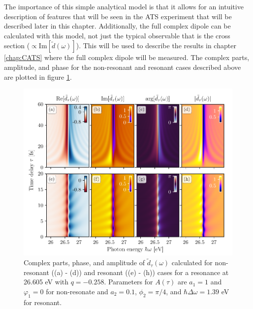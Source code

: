 The importance of this simple analytical model is that it allows for an intuitive description of features that will be seen in the ATS experiment that will be described later in this chapter.  Additionally, the full complex dipole can be calculated with this model, not just the typical observable that is the cross section ($\propto\mathrm{Im}[\tilde{d}(\omega)]$).  This will be used to describe the results in chapter \ref{chap:CATS} where the full complex dipole will be measured.  The complex parts, amplitude, and phase for the non-resonant and resonant cases described above are plotted in  figure \ref{fig:dip_components}.

\begin{figure}
	\centering
	\includegraphics[width=1.0\textwidth]{figures/ATS/dipole_components.pdf}
	\caption{Complex parts, phase, and amplitude of $\tilde{d}_\tau(\omega)$ calculated for non-resonant ((a) - (d)) and resonant ((e) - (h)) cases for a resonance at 26.605 eV with $q=-0.258$. Parameters for $A(\tau)$ are $a_1=1$ and $\varphi_1=0$ for non-resonate and $a_2=0.1$, $\phi_2=\pi/4$, and $\hbar\Delta\omega=1.39$ eV for resonant.}
	\label{fig:dip_components}
\end{figure}

